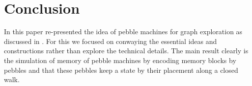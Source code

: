 \documentclass[draft,oneside]{scrartcl}
\begin{document}
\section{Conclusion}
In this paper re-presented the idea of pebble machines for graph exploration
as discussed in \cite{pebbles}. For this we focused on conwaying the essential
ideas and constructions rather than explore the technical details. The main
result clearly is the simulation of memory of pebble machines by encoding
memory blocks by pebbles and that these pebbles keep a state by their placement
along a closed walk.

\printbibliography
\end{document}
